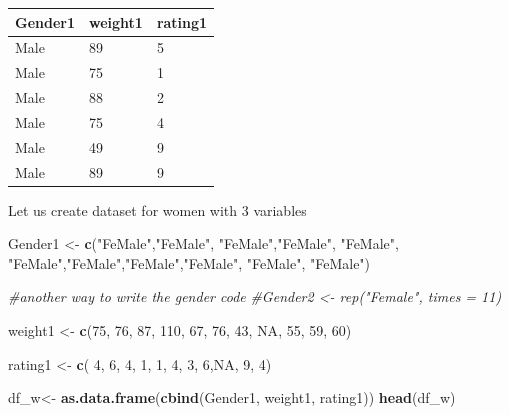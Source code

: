 \documentclass[
]{article}
\newenvironment{Shaded}{\begin{snugshade}}{\end{snugshade}}
\newcommand{\CommentTok}[1]{\textcolor[rgb]{0.56,0.35,0.01}{\textit{#1}}}
\newcommand{\ConstantTok}[1]{\textcolor[rgb]{0.56,0.35,0.01}{#1}}
\newcommand{\DecValTok}[1]{\textcolor[rgb]{0.00,0.00,0.81}{#1}}
\newcommand{\FunctionTok}[1]{\textcolor[rgb]{0.13,0.29,0.53}{\textbf{#1}}}
\newcommand{\NormalTok}[1]{#1}
\newcommand{\OtherTok}[1]{\textcolor[rgb]{0.56,0.35,0.01}{#1}}
\newcommand{\StringTok}[1]{\textcolor[rgb]{0.31,0.60,0.02}{#1}}
\begin{document}
\begin{longtable}[]{@{}lll@{}}
\toprule\noalign{}
Gender1 & weight1 & rating1 \\
\midrule\noalign{}
\endhead
\bottomrule\noalign{}
\endlastfoot
Male & 89 & 5 \\
Male & 75 & 1 \\
Male & 88 & 2 \\
Male & 75 & 4 \\
Male & 49 & 9 \\
Male & 89 & 9 \\
\end{longtable}

Let us create dataset for women with 3 variables

\begin{Shaded}
\begin{Highlighting}[]
\NormalTok{Gender1 }\OtherTok{\textless{}{-}} \FunctionTok{c}\NormalTok{(}\StringTok{"FeMale"}\NormalTok{,}\StringTok{"FeMale"}\NormalTok{, }\StringTok{"FeMale"}\NormalTok{,}\StringTok{"FeMale"}\NormalTok{, }\StringTok{"FeMale"}\NormalTok{,}
            \StringTok{"FeMale"}\NormalTok{,}\StringTok{"FeMale"}\NormalTok{,}\StringTok{"FeMale"}\NormalTok{,}\StringTok{"FeMale"}\NormalTok{, }\StringTok{"FeMale"}\NormalTok{, }\StringTok{"FeMale"}\NormalTok{)}


\CommentTok{\#another way to write the gender code}
\CommentTok{\#Gender2 \textless{}{-} rep("Female", times = 11)}

\NormalTok{weight1 }\OtherTok{\textless{}{-}} \FunctionTok{c}\NormalTok{(}\DecValTok{75}\NormalTok{, }\DecValTok{76}\NormalTok{, }\DecValTok{87}\NormalTok{, }\DecValTok{110}\NormalTok{, }\DecValTok{67}\NormalTok{, }\DecValTok{76}\NormalTok{, }\DecValTok{43}\NormalTok{, }\ConstantTok{NA}\NormalTok{, }\DecValTok{55}\NormalTok{, }\DecValTok{59}\NormalTok{, }\DecValTok{60}\NormalTok{) }

\NormalTok{rating1 }\OtherTok{\textless{}{-}} \FunctionTok{c}\NormalTok{( }\DecValTok{4}\NormalTok{, }\DecValTok{6}\NormalTok{, }\DecValTok{4}\NormalTok{, }\DecValTok{1}\NormalTok{, }\DecValTok{1}\NormalTok{, }\DecValTok{4}\NormalTok{, }\DecValTok{3}\NormalTok{, }\DecValTok{6}\NormalTok{,}\ConstantTok{NA}\NormalTok{, }\DecValTok{9}\NormalTok{, }\DecValTok{4}\NormalTok{) }


\NormalTok{df\_w}\OtherTok{\textless{}{-}} \FunctionTok{as.data.frame}\NormalTok{(}\FunctionTok{cbind}\NormalTok{(Gender1, weight1, rating1))}
\FunctionTok{head}\NormalTok{(df\_w)}
\end{Highlighting}
\end{Shaded}
\end{document}
